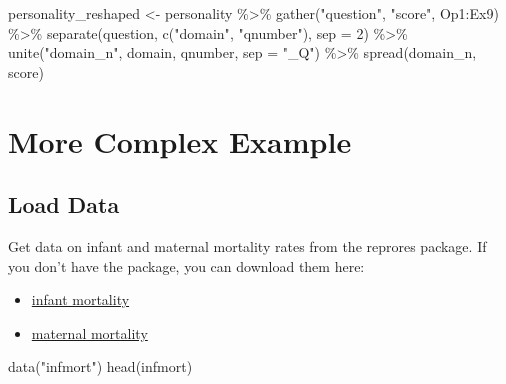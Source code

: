 \documentclass[
  oneside]{book}
\newenvironment{Shaded}{\begin{snugshade}}{\end{snugshade}}
\newcommand{\AttributeTok}[1]{\textcolor[rgb]{0.77,0.63,0.00}{#1}}
\newcommand{\DecValTok}[1]{\textcolor[rgb]{0.00,0.00,0.81}{#1}}
\newcommand{\FunctionTok}[1]{\textcolor[rgb]{0.00,0.00,0.00}{#1}}
\newcommand{\NormalTok}[1]{#1}
\newcommand{\OtherTok}[1]{\textcolor[rgb]{0.56,0.35,0.01}{#1}}
\newcommand{\SpecialCharTok}[1]{\textcolor[rgb]{0.00,0.00,0.00}{#1}}
\newcommand{\StringTok}[1]{\textcolor[rgb]{0.31,0.60,0.02}{#1}}
\providecommand{\tightlist}{%
  \setlength{\itemsep}{0pt}\setlength{\parskip}{0pt}}
\begin{document}
\begin{Shaded}
\begin{Highlighting}[]
\NormalTok{personality\_reshaped }\OtherTok{\textless{}{-}}\NormalTok{ personality }\SpecialCharTok{\%\textgreater{}\%}
  \FunctionTok{gather}\NormalTok{(}\StringTok{"question"}\NormalTok{, }\StringTok{"score"}\NormalTok{, Op1}\SpecialCharTok{:}\NormalTok{Ex9) }\SpecialCharTok{\%\textgreater{}\%}
  \FunctionTok{separate}\NormalTok{(question, }\FunctionTok{c}\NormalTok{(}\StringTok{"domain"}\NormalTok{, }\StringTok{"qnumber"}\NormalTok{), }\AttributeTok{sep =} \DecValTok{2}\NormalTok{) }\SpecialCharTok{\%\textgreater{}\%}
  \FunctionTok{unite}\NormalTok{(}\StringTok{"domain\_n"}\NormalTok{, domain, qnumber, }\AttributeTok{sep =} \StringTok{"\_Q"}\NormalTok{) }\SpecialCharTok{\%\textgreater{}\%}
  \FunctionTok{spread}\NormalTok{(domain\_n, score)}
\end{Highlighting}
\end{Shaded}

\hypertarget{more-complex-example}{%
\section{More Complex Example}\label{more-complex-example}}

\hypertarget{load-data-1}{%
\subsection{Load Data}\label{load-data-1}}

Get data on infant and maternal mortality rates from the reprores package. If you don't have the package, you can download them here:

\begin{itemize}
\tightlist
\item
  \href{https://psyteachr.github.io/reprores/data/infmort.csv}{infant mortality}\\
\item
  \href{https://psyteachr.github.io/reprores/data/matmort.xls}{maternal mortality}
\end{itemize}

\begin{Shaded}
\begin{Highlighting}[]
\FunctionTok{data}\NormalTok{(}\StringTok{"infmort"}\NormalTok{)}
\FunctionTok{head}\NormalTok{(infmort)}
\end{Highlighting}
\end{Shaded}
\end{document}
